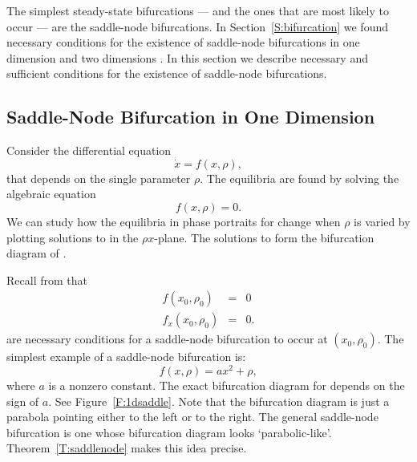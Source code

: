 \label{S:SNB}
  


The simplest steady-state bifurcations --- and the ones that are most
likely to occur --- are the saddle-node bifurcations.  In 
Section~\ref{S:bifurcation} we found necessary conditions for the existence 
of saddle-node bifurcations in one dimension  and two 
dimensions .  In this section we describe necessary and 
sufficient conditions for the existence of saddle-node bifurcations.


\subsection*{Saddle-Node Bifurcation in One Dimension}

Consider the differential equation 
\begin{equation} \label{e:1dbif}
\dot{x} = f(x,\rho),
\end{equation}
that depends on the single parameter $\rho$.  The equilibria are 
found by solving the algebraic equation 
\begin{equation} \label{e:1dstst}
f(x,\rho) = 0.
\end{equation}
We can study how the equilibria in phase portraits for  
change when $\rho$ is varied by plotting
solutions to  in the $\rho x$-plane.  The solutions to
 form the bifurcation diagram of .

Recall from  that  
\begin{equation}  \label{e:1dbifcond}
\begin{array}{rcl}
f(x_0,\rho_0) & = & 0 \\
f_x(x_0,\rho_0) & = & 0.
\end{array}
\end{equation}
are necessary conditions for a saddle-node bifurcation to occur at
$(x_0,\rho_0)$.  The simplest example of a saddle-node bifurcation is:
\begin{equation}  \label{e:1dsaddlenf}
f(x,\rho) = a x^2 + \rho,
\end{equation}
where $a$ is a nonzero constant.  The exact bifurcation diagram for 
 depends on the sign of $a$.  See Figure~\ref{F:1dsaddle}.  
Note that the bifurcation diagram is just a parabola pointing either to the 
left or to the right.  The general saddle-node bifurcation is one whose 
bifurcation diagram looks `parabolic-like'.  Theorem~\ref{T:saddlenode}
makes this idea precise.

